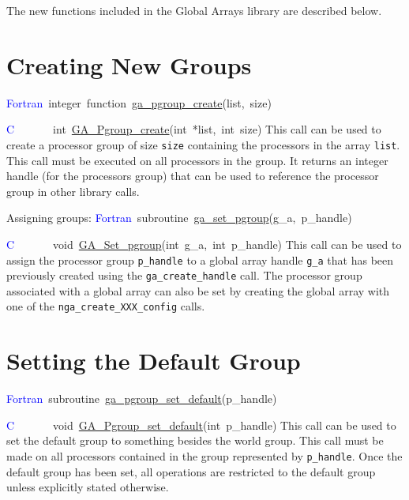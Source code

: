 The new functions included in the Global Arrays library are described
below. 


\section{Creating New Groups}
\textcolor{blue}{Fortran}~integer~function~\href{https://hpc.pnl.gov/globalarrays/api/f_op_api.html\#GA_PGROUP_CREATE}{ga\_{}pgroup\_{}create}(list,~size)

\textcolor{blue}{C}~~~~~~~int~\href{https://hpc.pnl.gov/globalarrays/api/c_op_api.html\#GA_PGROUP_CREATE}{GA\_{}Pgroup\_{}create}(int~{*}list,~int~size)
This call can be used to create a processor group of size \texttt{size}
containing the processors in the array \texttt{list}. This call must
be executed on all processors in the group. It returns an integer
handle (for the processors group) that can be used to reference the
processor group in other library calls.

Assigning groups:
\textcolor{blue}{Fortran}~subroutine~\href{https://hpc.pnl.gov/globalarrays/api/f_op_api.html\#GA_SET_PGROUP}{ga\_{}set\_{}pgroup}(g\_a,~p\_handle)

\textcolor{blue}{C}~~~~~~~void~\href{https://hpc.pnl.gov/globalarrays/api/c_op_api.html\#GA_SET_PGROUP}{GA\_{}Set\_{}pgroup}(int~g\_a,~int~p\_handle)
This call can be used to assign the processor group \texttt{p\_handle}
to a global array handle \texttt{g\_a} that has been previously created
using the \texttt{ga\_create\_handle} call. The processor group associated
with a global array can also be set by creating the global array with
one of the \texttt{nga\_create\_XXX\_config} calls. 


\section{Setting the Default Group}
\textcolor{blue}{Fortran}~subroutine~\href{https://hpc.pnl.gov/globalarrays/api/f_op_api.html\#GA_PGROUP_SET_DEFAULT}{ga\_{}pgroup\_{}set\_{}default}(p\_handle)

\textcolor{blue}{C}~~~~~~~void~\href{https://hpc.pnl.gov/globalarrays/api/c_op_api.html\#GA_PGROUP_SET_DEFAULT}{GA\_{}Pgroup\_{}set\_{}default}(int~p\_handle)
This call can be used to set the default group to something besides
the world group. This call must be made on all processors contained
in the group represented by \texttt{p\_handle}. Once the default group
has been set, all operations are restricted to the default group unless
explicitly stated otherwise. 


